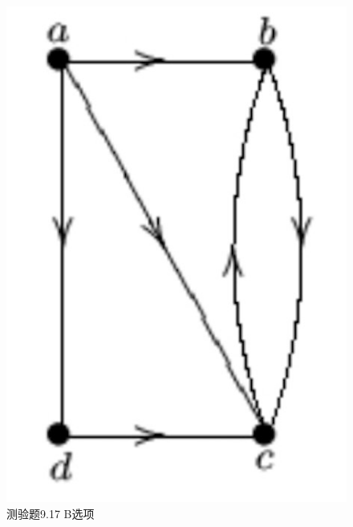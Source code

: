 \documentclass[UTF8, heading=true]{ctexart}
\begin{document}
\begin{figure}[H]
\begin{minipage}[t]{0.2\textwidth}
      \includegraphics[width=1\textwidth]{9.17_2.jpg} %
      \vspace{-0.3cm}
      \caption{测验题9.17 B选项}
\end{minipage}
\end{figure}
\end{document}
